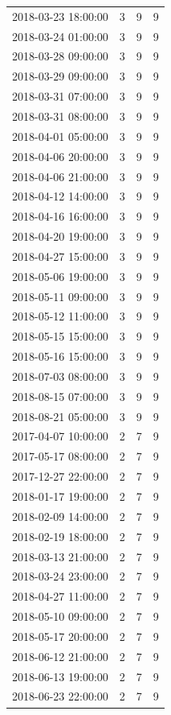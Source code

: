 \begin{tabular}{lrrr}
2018-03-23 18:00:00 & 3 & 9 & 9 \\
2018-03-24 01:00:00 & 3 & 9 & 9 \\
2018-03-28 09:00:00 & 3 & 9 & 9 \\
2018-03-29 09:00:00 & 3 & 9 & 9 \\
2018-03-31 07:00:00 & 3 & 9 & 9 \\
2018-03-31 08:00:00 & 3 & 9 & 9 \\
2018-04-01 05:00:00 & 3 & 9 & 9 \\
2018-04-06 20:00:00 & 3 & 9 & 9 \\
2018-04-06 21:00:00 & 3 & 9 & 9 \\
2018-04-12 14:00:00 & 3 & 9 & 9 \\
2018-04-16 16:00:00 & 3 & 9 & 9 \\
2018-04-20 19:00:00 & 3 & 9 & 9 \\
2018-04-27 15:00:00 & 3 & 9 & 9 \\
2018-05-06 19:00:00 & 3 & 9 & 9 \\
2018-05-11 09:00:00 & 3 & 9 & 9 \\
2018-05-12 11:00:00 & 3 & 9 & 9 \\
2018-05-15 15:00:00 & 3 & 9 & 9 \\
2018-05-16 15:00:00 & 3 & 9 & 9 \\
2018-07-03 08:00:00 & 3 & 9 & 9 \\
2018-08-15 07:00:00 & 3 & 9 & 9 \\
2018-08-21 05:00:00 & 3 & 9 & 9 \\
2017-04-07 10:00:00 & 2 & 7 & 9 \\
2017-05-17 08:00:00 & 2 & 7 & 9 \\
2017-12-27 22:00:00 & 2 & 7 & 9 \\
2018-01-17 19:00:00 & 2 & 7 & 9 \\
2018-02-09 14:00:00 & 2 & 7 & 9 \\
2018-02-19 18:00:00 & 2 & 7 & 9 \\
2018-03-13 21:00:00 & 2 & 7 & 9 \\
2018-03-24 23:00:00 & 2 & 7 & 9 \\
2018-04-27 11:00:00 & 2 & 7 & 9 \\
2018-05-10 09:00:00 & 2 & 7 & 9 \\
2018-05-17 20:00:00 & 2 & 7 & 9 \\
2018-06-12 21:00:00 & 2 & 7 & 9 \\
2018-06-13 19:00:00 & 2 & 7 & 9 \\
2018-06-23 22:00:00 & 2 & 7 & 9 \\

\end{tabular}
